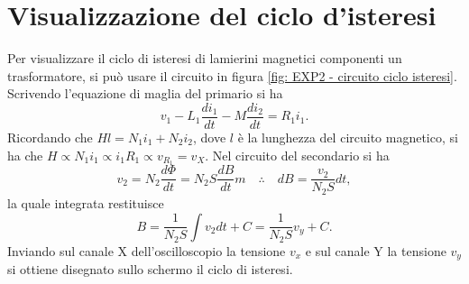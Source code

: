 \section{Visualizzazione del ciclo d'isteresi}
Per visualizzare il ciclo di isteresi di lamierini magnetici componenti un trasformatore, si può usare il circuito in figura \ref{fig: EXP2 - circuito ciclo isteresi}. Scrivendo l'equazione di maglia del primario si ha
\begin{equation}
    v_1 - L_1 \frac{d i_1}{dt} - M\frac{d i_2}{dt} = R_1i_1.
\end{equation}
Ricordando che $Hl=N_1i_1+N_2i_2$, dove $l$ è la lunghezza del circuito magnetico, si ha che $H\propto N_1i_1\propto i_1R_1 \propto v_{R_1}=v_X$. Nel circuito del secondario si ha
\begin{equation}
    v_2 = N_2 \frac{d\Phi}{dt} = N_2S\frac{dB}{dt}m\quad\therefore\quad dB=\frac{v_2}{N_2S}dt,
    \label{placeholder_label}
\end{equation}
la quale integrata restituisce
\begin{equation}
    B=\frac{1}{N_2S}\int v_2dt+C=\frac{1}{N_2S}v_y+C.
\end{equation}
Inviando sul canale X dell'oscilloscopio la tensione $v_x$ e sul canale Y la tensione $v_y$ si ottiene disegnato sullo schermo il ciclo di isteresi.